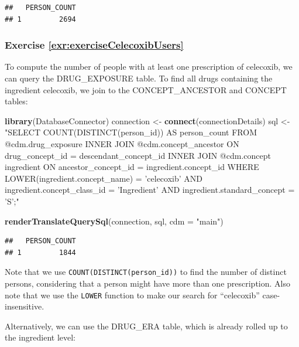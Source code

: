 \documentclass[11pt]{book}
\newenvironment{Shaded}{\begin{snugshade}}{\end{snugshade}}
\newcommand{\DataTypeTok}[1]{\textcolor[rgb]{0.13,0.29,0.53}{#1}}
\newcommand{\KeywordTok}[1]{\textcolor[rgb]{0.13,0.29,0.53}{\textbf{#1}}}
\newcommand{\NormalTok}[1]{#1}
\newcommand{\StringTok}[1]{\textcolor[rgb]{0.31,0.60,0.02}{#1}}
\theoremstyle{definition}
\theoremstyle{definition}
\theoremstyle{definition}
\theoremstyle{remark}
\begin{document}
\begin{verbatim}
##   PERSON_COUNT
## 1         2694
\end{verbatim}

\hypertarget{exercise-refexrexercisecelecoxibusers}{%
\subsubsection*{Exercise \ref{exr:exerciseCelecoxibUsers}}\label{exercise-refexrexercisecelecoxibusers}}

To compute the number of people with at least one prescription of celecoxib, we can query the DRUG\_EXPOSURE table. To find all drugs containing the ingredient celecoxib, we join to the CONCEPT\_ANCESTOR and CONCEPT tables:

\begin{Shaded}
\begin{Highlighting}[]
\KeywordTok{library}\NormalTok{(DatabaseConnector)}
\NormalTok{connection <-}\StringTok{ }\KeywordTok{connect}\NormalTok{(connectionDetails)}
\NormalTok{sql <-}\StringTok{ "SELECT COUNT(DISTINCT(person_id)) AS person_count}
\StringTok{FROM @cdm.drug_exposure}
\StringTok{INNER JOIN @cdm.concept_ancestor}
\StringTok{  ON drug_concept_id = descendant_concept_id}
\StringTok{INNER JOIN @cdm.concept ingredient}
\StringTok{  ON ancestor_concept_id = ingredient.concept_id}
\StringTok{WHERE LOWER(ingredient.concept_name) = 'celecoxib'}
\StringTok{  AND ingredient.concept_class_id = 'Ingredient'}
\StringTok{  AND ingredient.standard_concept = 'S';"}

\KeywordTok{renderTranslateQuerySql}\NormalTok{(connection, sql, }\DataTypeTok{cdm =} \StringTok{"main"}\NormalTok{)}
\end{Highlighting}
\end{Shaded}

\begin{verbatim}
##   PERSON_COUNT
## 1         1844
\end{verbatim}

Note that we use \texttt{COUNT(DISTINCT(person\_id))} to find the number of distinct persons, considering that a person might have more than one prescription. Also note that we use the \texttt{LOWER} function to make our search for ``celecoxib'' case-insensitive.

Alternatively, we can use the DRUG\_ERA table, which is already rolled up to the ingredient level:
\end{document}
